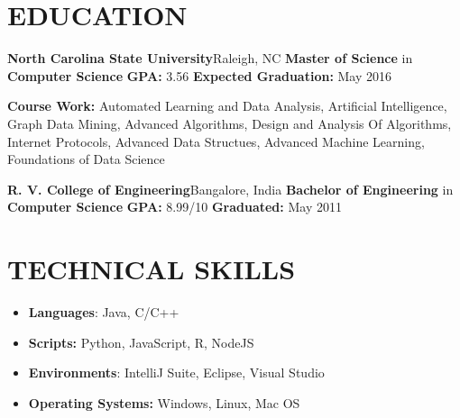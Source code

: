 \documentclass[11pt, letterpaper]{article}
\begin{document}
	\begin{multicols}{2}
		\section*{EDUCATION}
			\vspace{0.2cm}
			{\bfseries \large North Carolina State University}\hfill Raleigh, NC\newline
			{\bfseries Master of Science} in {\bfseries Computer Science} \newline
			{\bfseries GPA:} 3.56 \hfill {\bfseries Expected Graduation:} May 2016\par
			{\bfseries Course Work:} Automated Learning and Data Analysis, Artificial Intelligence, Graph Data Mining, Advanced Algorithms, Design and Analysis Of Algorithms, Internet Protocols, Advanced Data Structues, Advanced Machine Learning, Foundations of Data Science\newline
			\par
			{\bfseries \large R. V. College of Engineering}\hfill Bangalore, India\newline
			{\bfseries Bachelor of Engineering} in {\bfseries Computer Science} \newline
			{\bfseries GPA:} 8.99/10 \hfill {\bfseries Graduated:} May 2011

		\section*{TECHNICAL SKILLS}
			\begin{itemize}[nolistsep,leftmargin=*]
				\item \textbf{Languages}: Java, C/C++
				\item \textbf{Scripts:} Python, JavaScript, R, NodeJS
				\item \textbf{Environments}: IntelliJ Suite, Eclipse, Visual Studio
				\item \textbf{Operating Systems:} Windows, Linux, Mac OS
			\end{itemize}


\end{multicols}
\end{document}
